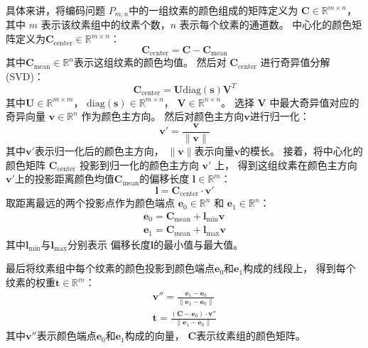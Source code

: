 具体来讲，将编码问题 $P_{m,n}$中的一组纹素的颜色组成的矩阵定义为
$\mathbf{C}\in\mathbb{R}^{m\times n}$，其中 $m$ 表示该纹素组中的纹素个数，$n$ 表示每个纹素的通道数。
中心化的颜色矩阵定义为$\mathbf{C}_{\text{center}}\in\mathbb{R}^{m\times n}$：
\begin{equation}
\mathbf{C}_{\text{center}}=\mathbf{C}-\mathbf{C}_{\text{mean}}
\end{equation}
其中$\mathbf{C}_{\text{mean}}\in\mathbb{R}^{n}$表示这组纹素的颜色均值。
然后对 $\mathbf{C}_{\text{center}}$ 进行奇异值分解(SVD)：
\begin{equation}
\mathbf{C}_{\text{center}}=\mathbf{U}\text{diag}(\mathbf{s})\mathbf{V}^T
\end{equation}
其中$\mathbf{U}\in \mathbb{R}^{m \times m}$，
$\text{diag}(\mathbf{s})\in\mathbb{R}^{m\times n}$，
$\mathbf{V}\in \mathbb{R}^{n\times n}$。
选择 $\mathbf{V}$ 中最大奇异值对应的奇异向量 $\mathbf{v}\in \mathbb{R}^{n}$ 作为颜色主方向。
然后对颜色主方向$\mathbf{v}$进行归一化：
\begin{equation}
    \mathbf{v}'=\frac{\mathbf{v}}{\|\mathbf{v}\|}
\end{equation}
其中$\mathbf{v}'$表示归一化后的颜色主方向，
$\|\mathbf{v}\|$表示向量$\mathbf{v}$的模长。
接着，将中心化的颜色矩阵 $\mathbf{C}_\text{center}$ 投影到归一化的颜色主方向 $\mathbf{v}'$ 上，
得到这组纹素在颜色主方向$\mathbf{v}'$上的投影距离颜色均值$\mathbf{C}_{\text{mean}}$的偏移长度 $\mathbf{l}\in\mathbb{R}^{m}$：
\begin{equation}
\mathbf{l}=\mathbf{C}_{\text{center}}\cdot\mathbf{v}'
\end{equation}
取距离最远的两个投影点作为颜色端点
$\mathbf{e}_0\in\mathbb{R}^n$ 和 $\mathbf{e}_1\in\mathbb{R}^n$：
\begin{align}
\mathbf{e}_0=\mathbf{C}_{\text{mean}}+\mathbf{l}_\text{min}\mathbf{v}\\
\mathbf{e}_1=\mathbf{C}_{\text{mean}}+\mathbf{l}_\text{max}\mathbf{v}
\end{align}
其中$\mathbf{l}_\text{min}$与$\mathbf{l}_\text{max}$分别表示
偏移长度$\mathbf{l}$的最小值与最大值。

最后将纹素组中每个纹素的颜色投影到颜色端点$\mathbf{e}_0$和$\mathbf{e}_1$构成的线段上，
得到每个纹素的权重$\mathbf{t}\in\mathbb{R}^m$：
\begin{align}
    \mathbf{v''}=\frac{\mathbf{e}_1-\mathbf{e}_0}{\|\mathbf{e}_1-\mathbf{e}_0\|}\\
    \mathbf{t}=\frac{(\mathbf{C}-\mathbf{e}_0)\cdot\mathbf{v''}}{\|\mathbf{e}_1-\mathbf{e}_0\|}
\end{align}
其中$\mathbf{v''}$表示颜色端点$\mathbf{e}_0$和$\mathbf{e}_1$构成的向量，
$\mathbf{C}$表示纹素组的颜色矩阵。

